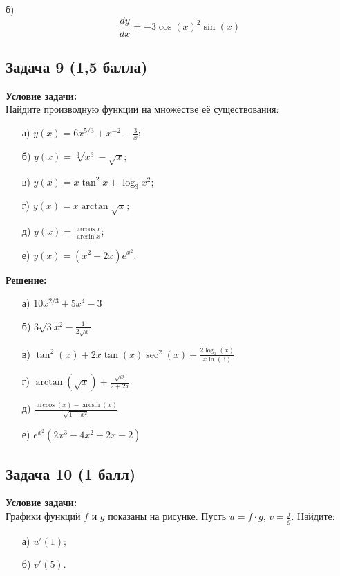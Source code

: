 \documentclass[a4paper,12pt]{article}
\begin{document}
б) \[
\frac{dy}{dx} = -3\cos(x)^2\sin(x)
\]

\vspace{1cm}

\subsection{Задача 9 (1,5 балла)}
\textbf{Условие задачи:} \\
Найдите производную функции на множестве её существования:
\begin{itemize}
    \item[а)] \( y(x) = 6x^{5/3} + x^{-2} - \frac{3}{x} \);
    \item[б)] \( y(x) = \sqrt[3]{x^3} - \sqrt{x} \);
    \item[в)] \( y(x) = x \tan^2 x + \log_3 x^2 \);
    \item[г)] \( y(x) = x \arctan \sqrt{x} \);
    \item[д)] \( y(x) = \frac{\arccos x}{\arcsin x} \);
    \item[е)] \( y(x) = (x^2 - 2x)e^{x^2} \).
\end{itemize}

\textbf{Решение:} \\

\begin{itemize}
    \item[а)] $10x^{2/3}+5x^4-3$
    \item[б)] $3\sqrt{3}x^2-\frac{1}{2\sqrt{x}}$
    \item[в)] $\tan^2(x)+2x\tan(x)\sec^2(x)+\frac{2\log_3(x)}{x\ln(3)}$
    \item[г)] $\arctan(\sqrt{x}) + \frac{\sqrt{x}}{2+2x}$
    \item[д)] $\frac{\arccos(x)-\arcsin(x)}{\sqrt{1-x^2}}$
    \item[е)] $e^{x^{2}}(2x^3-4x^2+2x-2)$
\end{itemize}

\vspace{1cm}

\subsection{Задача 10 (1 балл)}
\textbf{Условие задачи:} \\
Графики функций \( f \) и \( g \) показаны на рисунке. Пусть \( u = f \cdot g \), \( v = \frac{f}{g} \). Найдите:
\begin{itemize}
    \item[а)] \( u'(1) \);
    \item[б)] \( v'(5) \).
\end{itemize}
\end{document}
